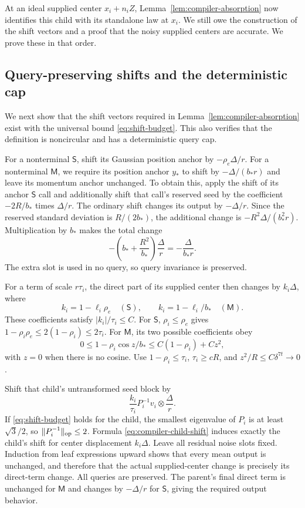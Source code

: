 At an ideal supplied center $x_i+n_iZ$, Lemma~\ref{lem:compiler-absorption}
now identifies this child with its standalone law at $x_i$.  We still
owe the construction of the shift vectors and a proof that the noisy
supplied centers are accurate.  We prove these in that order.

\subsection{Query-preserving shifts and the deterministic cap}

We next show that the shift vectors required in
Lemma~\ref{lem:compiler-absorption} exist with the universal bound
\eqref{eq:shift-budget}.  This also verifies that the definition is
noncircular and has a deterministic query cap.

For a nonterminal $\mathsf S$, shift its Gaussian position anchor by
$-\rho_e\Delta/r$.  For a nonterminal $\mathsf M$, we require its
position anchor $y_*$ to shift by $-\Delta/(b_*r)$ and leave its
momentum anchor unchanged.  To obtain this, apply the shift of its anchor
$\mathsf S$ call and additionally shift that call's reserved seed
by the coefficient $-2R/b_*$ times $\Delta/r$.  The ordinary shift
changes its output by $-\Delta/r$.  Since the reserved standard
deviation is $R/(2b_*)$, the additional change is
$-R^2\Delta/(b_*^2r)$.  Multiplication by $b_*$ makes the total
change
\[
 -\left(b_*+\frac{R^2}{b_*}\right)\frac{\Delta}{r}
 =-\frac{\Delta}{b_*r}.
\]
The extra slot is used in no query, so query invariance is preserved.

For a term of scale $r\tau_i$, the direct part of its supplied
center then changes by $k_i\Delta$, where
\[
 k_i=1-\ell_i\rho_e\quad(\mathsf S),
 \qquad
 k_i=1-\ell_i/b_*\quad(\mathsf M).
\]
These coefficients satisfy $|k_i|/\tau_i\le C$.  For $\mathsf S$,
$\rho_i\le\rho_e$ gives
$1-\rho_i\rho_e\le2(1-\rho_i)\le2\tau_i$.
For $\mathsf M$, its two possible coefficients obey
\[
 0\le1-\rho_i\cos z/b_*
 \le C(1-\rho_i)+Cz^2,
\]
with $z=0$ when there is no cosine.  Use
$1-\rho_i\le\tau_i$, $\tau_i\ge cR$, and
$z^2/R\le C\delta^{7t}\to0$.

Shift that child's untransformed seed block by
\begin{equation}
 \frac{k_i}{\tau_i}P_i^{-1}v_i\otimes\frac{\Delta}{r}.
 \label{eq:compiler-child-shift}
\end{equation}
If \eqref{eq:shift-budget} holds for the child, the smallest
eigenvalue of $P_i$ is at least $\sqrt3/2$, so
$\|P_i^{-1}\|_{\mathrm{op}}\le2$.  Formula
\eqref{eq:compiler-child-shift} induces exactly the child's shift
for center displacement $k_i\Delta$.  Leave all residual noise
slots fixed.  Induction from leaf expressions upward shows that
every mean output is unchanged, and therefore that the actual
supplied-center change is precisely its direct-term change.
All queries are preserved.  The parent's final direct term is
unchanged for $\mathsf M$ and changes by $-\Delta/r$ for
$\mathsf S$, giving the required output behavior.

